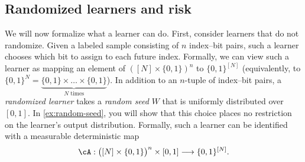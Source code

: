 \documentclass[11pt,twoside]{article}
\theoremstyle{definition}
\theoremstyle{remark}
\begin{document}
\subsection{Randomized learners and risk}
We will now formalize what a learner can do. First, consider learners that do
not randomize. Given a labeled sample consisting of $n$ index--bit pairs, such
a learner chooses which bit to assign to each future index.
Formally, we can view such a learner as mapping an element of
$([N]\times \{0,1\})^n$ to $\{0,1\}^{[N]}$ (equivalently, to
$\{0,1\}^N = \underbrace{\{0,1\}\times \dots \times \{0,1\}}_{N\text{ times}}$).
In addition to an $n$-tuple of index--bit pairs, a \emph{randomized learner} takes a
\emph{random seed} $W$ that is uniformly distributed over $[0,1]$.
In \cref{ex:random-seed}, you will show that this choice places no restriction
on the learner's output distribution.
Formally, such a learner can be identified with a measurable deterministic map
\begin{equation}
\cA:\bigl([N]\times\{0,1\}\bigr)^n\times[0,1]
\longrightarrow \{0,1\}^{[N]}.
\label{eq:randomized-algorithm}
\end{equation}
\end{document}
